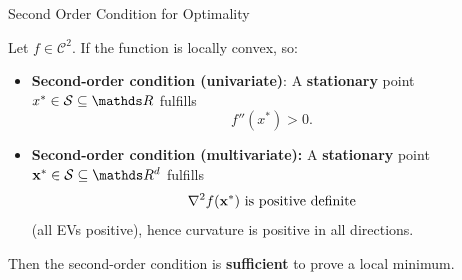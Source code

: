 \documentclass[11pt,compress,t,notes=noshow, xcolor=table]{beamer}
\begin{document}
  \begin{vbframe}{Second Order Condition for Optimality}
  

  
  Let $f \in \mathcal{C}^2$.  If the function is locally convex, so:

  \begin{itemize}
    \item \textbf{Second-order condition (univariate)}: A \textbf{stationary} point $x^\ast \in \mathcal{S}\subseteq \R$ fulfills
    $$f''(x^\ast) > 0.$$ 
    \item \textbf{Second-order condition (multivariate): } A \textbf{stationary} point $\xv^\ast \in \mathcal{S}\subseteq \R^d$ fulfills $$\nabla^2 f(\mathbf{x}^\ast) \text{ is positive definite}$$  (all EVs positive), hence curvature is positive in all directions. 
  
  \end{itemize}
  
 Then the second-order condition is \textbf{sufficient} to prove a local minimum. 

 \lz 

  


  
  


\end{vbframe}
\end{document}
